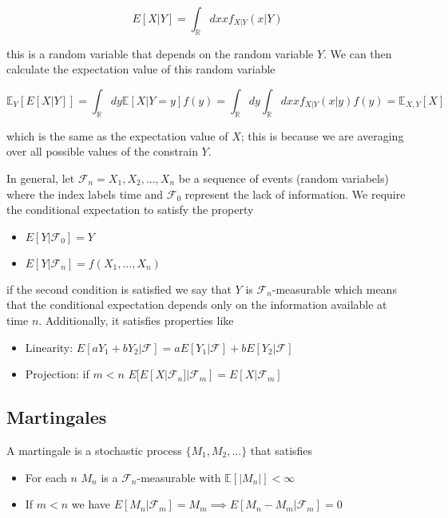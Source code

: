\documentclass[11pt,a4paper]{article}
\begin{document}
\begin{equation}
    E[X|Y] = \int_{\mathbb{R}} dx x f_{X|Y}(x|Y)
\end{equation}

this is a random variable that depends on the random variable $Y$.
We can then calculate the expectation value of this random variable

\begin{equation}
    \mathbb{E}_{Y}[E[X|Y]] = \int_{\mathbb{R}} dy  \mathbb{E}[X|Y=y] f(y) =  \int_{\mathbb{R}} dy   \int_{\mathbb{R}} dx x f_{X|Y}(x|y) f(y) = \mathbb{E}_{X,Y}[X]
\end{equation}

which is the same as the expectation value of $X$; this is because we are averaging over all possible values of the constrain $Y$.

In general, let $\mathcal{F}_n = X_1,X_2,...,X_n$ be a sequence of events (random variabels) where the index labels time and $\mathcal{F}_0$ represent the lack of information. We require the conditional expectation to satisfy the property

\begin{itemize}
    \item $E[Y|\mathcal{F}_0] = Y$
    \item $E[Y|\mathcal{F}_n] = f(X_1,...,X_n)$
\end{itemize}

if the second condition is satisfied we say that $Y$ is $\mathcal{F}_n$-measurable which means that the conditional expectation depends only on the information available at time $n$. Additionally, it satisfies properties like 

\begin{itemize}
    \item Linearity: $E[aY_1+bY_2|\mathcal{F}] = aE[Y_1|\mathcal{F}]+b E[Y_2|\mathcal{F}]$
    \item Projection: if $m<n$ $E[E[X|\mathcal{F}_n]|\mathcal{F}_m] = E[X|\mathcal{F}_m]$
\end{itemize}

\subsection{Martingales}

A martingale is a stochastic process $\{M_1,M_2,...\}$ that satisfies

\begin{itemize}
    \item For each $n$ $M_n$ is a $\mathcal{F}_n$-measurable with $\mathbb{E}[|M_n|]<\infty$
    \item If $m<n$ we have $E[M_n|\mathcal{F}_m] = M_m \implies E[M_n-M_m|\mathcal{F}_m] = 0$
\end{itemize}
\end{document}
